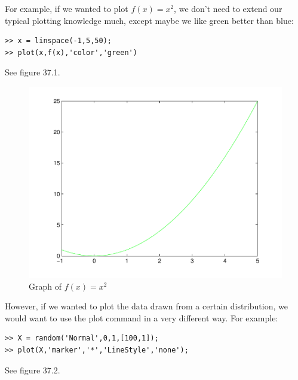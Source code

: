 For example, if we wanted to plot $f(x) = x^2$, we don't need to extend our typical plotting knowledge much, except maybe we like green better than blue:

\begin{matlab}
\begin{lstlisting}[style=matlab]
>> x = linspace(-1,5,50);
>> plot(x,f(x),'color','green')
\end{lstlisting}
\end{matlab}

See figure 37.1.

\begin{figure}
\begin{center}
\begin{matlab}
\includegraphics[scale=0.5]{./FiguresMAT/plot1}
\end{matlab}
\caption{Graph of $f(x) = x^2$}
\end{center}
\end{figure}


However, if we wanted to plot the data drawn from a certain distribution, we would want to use the plot command in a very different way.  For example:

\begin{matlab}
\begin{lstlisting}[style=matlab]
>> X = random('Normal',0,1,[100,1]);
>> plot(X,'marker','*','LineStyle','none');
\end{lstlisting}
\end{matlab}

See figure 37.2.

